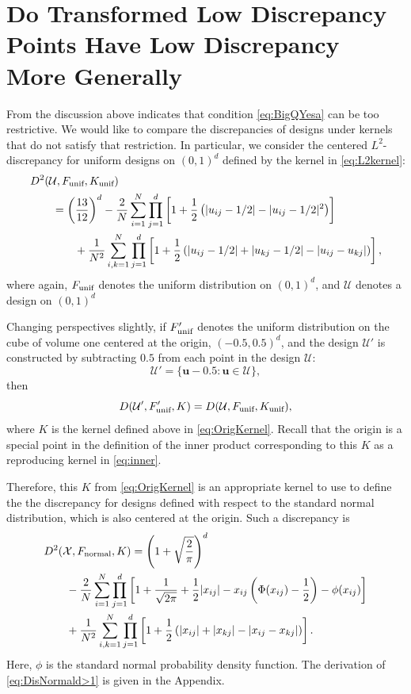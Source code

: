 \documentclass[graybox]{svmult}
\newcommand{\vu}{\boldsymbol{u}}
\newcommand{\Udes}{\mathcal{U}}
\newcommand{\Xdes}{\mathcal{X}}
\newcommand{\unif}{\textup{unif}}
\newcommand{\normal}{\textup{normal}}
\begin{document}
\section{Do Transformed Low Discrepancy Points Have Low Discrepancy More Generally}

From the discussion above indicates that condition \eqref{eq:BigQYesa} can be too restrictive.  We would like to compare the discrepancies of designs under kernels that do not satisfy that restriction.  In particular, we consider the centered $L^2$-discrepancy for uniform designs on $(0,1)^d$ defined by the kernel in \eqref{eq:L2kernel}:
\begin{align*}
\MoveEqLeft{D^2(\Udes, F_\unif, K_\unif)} \\
& = \left(\frac{13}{12}\right)^d - \frac{2}{N}\sum_{i=1}^N \prod_{j=1}^d \left[1+\frac{1}{2}\left(|u_{ij}-1/2|-|u_{ij}-1/2|^2\right) \right]\\
& \qquad + \frac{1}{N^2}\sum_{i,k=1}^N\prod_{j=1}^d\left[1+\frac{1}{2}\left(|u_{ij}-1/2|+|u_{kj}-1/2|-|u_{ij}-u_{kj}| \right) \right],  
\end{align*}
where again, $F_\unif$ denotes the uniform distribution on $(0,1)^d$, and $\Udes$ denotes a design on $(0,1)^d$

Changing perspectives slightly, if $F_\unif'$ denotes the uniform distribution on the cube of volume one centered at the origin, $(-0.5,0.5)^d$, and the design $\Udes'$ is constructed by  subtracting $\boldsymbol{0.5}$ from each point in the design $\Udes$:
\begin{equation} \label{eq:Updef}
    \Udes' = \{\vu -\boldsymbol{0.5} : \vu \in \Udes \},
\end{equation}
then 
\begin{equation} \label{eq:desEquiv}
     D(\Udes',F'_\unif,K) = D(\Udes, F_\unif, K_\unif),
\end{equation}
where $K$ is the kernel defined above in \eqref{eq:OrigKernel}.  Recall that the origin is a special point in the definition of the inner product corresponding to this $K$ as a reproducing kernel in \eqref{eq:inner}.

Therefore, this $K$ from \eqref{eq:OrigKernel} is an appropriate kernel to use to define the the discrepancy for designs defined with respect to the standard normal distribution, which is also centered at the origin.  Such a discrepancy is 
\begin{align}\label{eq:DisNormald>1}
\nonumber
\MoveEqLeft{D^2(\Xdes, F_\normal, K) = \left(1+\sqrt{\frac{2}{\pi}}\right)^d}\\
\nonumber
  & - \frac{2}{N}\sum_{i=1}^N \prod\limits_{j=1}^d\left[ 1+\frac{1}{\sqrt{2\pi}}+\frac{1}{2}|x_{ij}|-x_{ij}\left(\Phi(x_{ij})-\frac 12 \right)-\phi(x_{ij})\right]\\
  &+\frac{1}{N^2}\sum_{i,k=1}^N \prod_{j=1}^d \left[1+\frac{1}{2}\left(|x_{ij}|+|x_{kj}|-|x_{ij}-x_{kj}|\right)\right]. 
\end{align}
Here, $\phi$ is the standard normal probability density function. 
The derivation of \eqref{eq:DisNormald>1} is given in the Appendix. 
\end{document}
